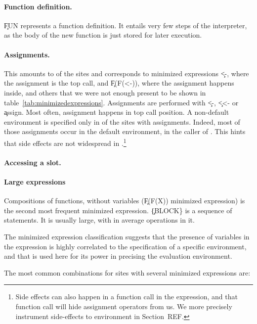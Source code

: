 \documentclass[acmsmall]{acmart}
\begin{document}
\paragraph{Function definition.} \c{FUN} represents a function definition. It entails very few steps of the interpreter, as the body of the new function is just stored for later execution.

\paragraph{Assignments.} This amounts to \packageAssignSitesPercent of the sites and corresponds to minimized expressions \c{<-}, where the assignment is the top call, and \c{F(F(<-))}, where the assignment happens inside, and others that we were not enough present to be shown in table~\ref{tab:minimizedexpressions}.  Assignments are performed with \c{<-}, \c{<<-} or \c{assign}. Most often, assignment happens in top call position. A non-default environment is specified only in \packageNonDefaultEnvirAssignSitesPercent of the sites with assignments. Indeed, most of those assignments occur in the default environment, \ie in the caller of \eval. This hints that side effects are not widespread in \eval.\footnote{Side effects can also happen in a function call in the \eval expression, and that function call will hide assignment operators from us. We more precisely instrument side-effects to environment in Section~REF.}

\paragraph{Accessing a slot.}

\paragraph{Large expressions }  Compositions of functions, without variables (\c{F(F(X))} minimized expression) is the second most frequent minimized expression. \c{\{BLOCK\}} is a sequence of statements. It is usually large, with in average \packageMinimizedoperationsjRnd operations in it.



The minimized expression classification suggests that the presence of variables in the expression is highly correlated to the specification of a specific environment, and that \eval is used here for its power in precising the evaluation environment.


The most common combinations for sites with several minimized expressions are:
\end{document}
